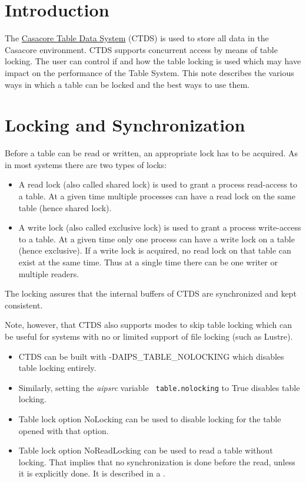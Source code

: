 \section{Introduction}
The \href{../255.html}{Casacore Table Data System} (CTDS)
is used to store all data in the Casacore environment.
CTDS supports concurrent access by means of table locking.
The user can control if and how the table locking is used which may have
impact on the performance of the Table System.
This note describes the various ways in which a table can be locked
and the best ways to use them.

\section{Locking and Synchronization}
Before a table can be read or written, an appropriate lock has to be
acquired. As in most systems there are two types of locks:
\begin{itemize}
\item A read lock (also called shared lock) is used to grant a process
read-access to a table. At a given time multiple processes can have
a read lock on the same table (hence shared lock).
\item A write lock (also called exclusive lock) is used to grant a
process write-access to a table. At a given time only one process can
have a write lock on a table (hence exclusive). If a write lock
is acquired, no read lock on that table can exist at the same time.
Thus at a single time there can be one writer or multiple readers.
\end{itemize}
The locking assures that the internal buffers of CTDS
are synchronized and kept consistent.

Note, however, that CTDS also supports modes to skip table locking
which can be useful for systems with no or limited support of file
locking (such as Lustre).
\begin{itemize}
\item CTDS can be built with -DAIPS\_TABLE\_NOLOCKING which disables
  table locking entirely.
\item Similarly, setting the {\it aipsrc} variable {\tt
    table.nolocking} to True disables table locking.
\item Table lock option NoLocking can be used to disable locking for
  the table opened with that option.
\item Table lock option NoReadLocking can be used to read a table without 
locking. That implies that no synchronization is done before the read,
unless it is explicitly done. It is described in a
.
\end{itemize}

